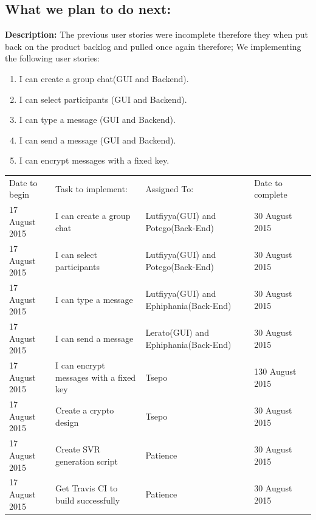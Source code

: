 \documentclass[a4paper]{article}
\begin{document}
\subsection{What we plan to do next:}
\textbf{Description: }The previous user stories were incomplete therefore they when put back on the product backlog and pulled once again therefore; We implementing the following user stories:
\begin{enumerate} 
\item I can create a group chat(GUI and Backend).
\item I can select participants (GUI and Backend).
\item I can type a message (GUI and Backend).
\item I can send a message (GUI and Backend).
\item I can encrypt messages with a fixed key.
\end{enumerate}

\setlength{\arrayrulewidth}{0.5mm}
\setlength{\tabcolsep}{12pt}
\renewcommand{\arraystretch}{2} 
\begin{tabular}{ |p{3cm}|p{3cm}|p{3cm}|p{3cm}|p{3cm}|  }
\hline
\rowcolor{lightgray}\multicolumn{4}{|c|}{Work to Complete} \\
\hline 
Date to begin & Task to implement: & Assigned To: & Date to complete\\
\hline
17 August 2015 & I can create a group chat & Lutfiyya(GUI) and  Potego(Back-End) & 30 August 2015\\ 
\hline
17 August 2015 & I can select participants & Lutfiyya(GUI) and Potego(Back-End) & 30 August 2015\\ 
\hline
17 August 2015 & I can type a message & Lutfiyya(GUI) and Ephiphania(Back-End) & 30 August 2015\\ 
\hline
17 August 2015 & I can send a message & Lerato(GUI) and Ephiphania(Back-End) & 30 August 2015\\ 
\hline
17 August 2015 & I can encrypt messages with a fixed key & Tsepo  & 130 August 2015\\ 
\hline
17 August 2015 & Create a crypto design & Tsepo  & 30 August 2015\\ 
\hline

17 August 2015 & Create SVR generation script & Patience & 30 August 2015\\ 
\hline
17 August 2015 & Get Travis CI to build successfully & Patience & 30 August 2015\\ 
\hline

\end{tabular}
\end{document}
